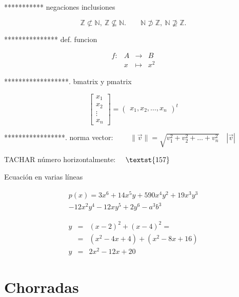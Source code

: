 *********** negaciones inclusiones

$$\mathbb{Z} \not\subset \mathbb{N},\ \mathbb{Z} \not\subseteq \mathbb{N}.
\qquad 
\mathbb{N} \not\supset \mathbb{Z},\ \mathbb{N} \not\supseteq \mathbb{Z}. $$

*************** def. funcion

$$\begin{array}{rccl}
f: & A & \longrightarrow & B \\
& x & \mapsto & x^2
\end{array}$$



******************. bmatrix y pmatrix

$$\begin{bmatrix}
x_{1} \\
x_{2} \\
\vdots \\
x_{n}
\end{bmatrix}
=
\begin{pmatrix}
x_1, x_2, \dots, x_n
\end{pmatrix}^{t}$$

*****************. norma vector: $\qquad \|\vec{v}\|=\sqrt{v_1^2+v_2^2+\ldots+v_n^2} \quad |\vec v|$


TACHAR número horizontalmente: $\quad \text{\textst{157}}$



Ecuación en varias líneas

\begin{multline*}
p(x) = 3x^6 + 14x^5y + 590x^4y^2 + 19x^3y^3\\ 
- 12x^2y^4 - 12xy^5 + 2y^6 - a^3b^3
\end{multline*}



\begin{eqnarray*}
y & = & (x-2)^2+(x-4)^2 = \nonumber \\
  & = & (x^2-4x+4)+(x^2-8x+16) \\
y & = & 2x^2-12x+20
\end{eqnarray*}




\section{Chorradas}
\vspace{10mm}
\begin{center}
\end{center}

